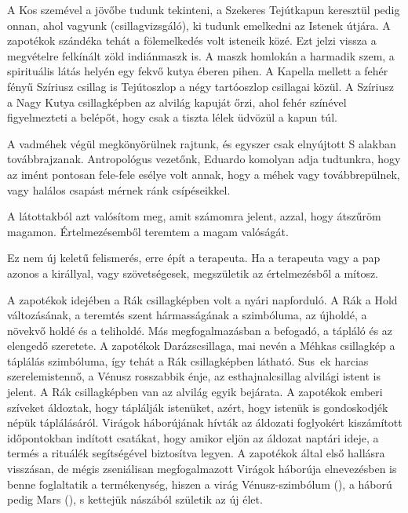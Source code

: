 A Kos szemével a jövőbe tudunk tekinteni, a Szekeres Tejútkapun
keresztül pedig onnan, ahol vagyunk (csillagvizsgáló), ki tudunk emelkedni
az Istenek útjára. A zapotékok szándéka tehát a fölemelkedés volt
isteneik közé. Ezt jelzi vissza a megvételre felkínált zöld indiánmaszk is.
A maszk homlokán a harmadik szem, a spirituális látás helyén egy fekvő
kutya éberen pihen. A Kapella mellett a fehér fényű Szíriusz csillag is
Tejútoszlop a négy tartóoszlop csillagai közül. A Szíriusz a Nagy Kutya
csillagképben az alvilág kapuját őrzi, ahol fehér színével figyelmezteti a
belépőt, hogy csak a tiszta lélek üdvözül a kapun túl.

A vadméhek végül megkönyörülnek rajtunk, és egyszer csak elnyújtott
S alakban továbbrajzanak. Antropológus vezetőnk, Eduardo
komolyan adja tudtunkra, hogy az imént pontosan fele-fele esélye volt
annak, hogy a méhek vagy továbbrepülnek, vagy halálos csapást mérnek
ránk csípéseikkel.


\bigskip
\begin{itshape}
A látottakból azt valósítom meg, amit számomra jelent, azzal, hogy
átszűröm magamon. Értelmezésemből teremtem a magam valóságát.
\end{itshape}
\bigskip

Ez nem új keletű felismerés, erre épít a terapeuta. Ha a terapeuta
vagy a pap azonos a királlyal, vagy szövetségesek, megszületik az
értelmezésből a mítosz.

A zapotékok idejében a Rák csillagképben volt a nyári napforduló.
A Rák a Hold változásának, a teremtés szent hármasságának a szimbóluma,
az újholdé, a növekvő holdé és a teliholdé. Más megfogalmazásban
a befogadó, a tápláló és az elengedő szeretete. A zapotékok
Darázscsillaga, mai nevén a Méhkas csillagkép a táplálás szimbóluma,
így tehát a Rák csillagképben látható. Sus~ek harcias szerelemistennő,
a Vénusz rosszabbik énje, az esthajnalcsillag alvilági istent is jelent.
A Rák csillagképben van az alvilág egyik bejárata. A zapotékok emberi
szíveket áldoztak, hogy táplálják istenüket, azért, hogy istenük is
gondoskodjék népük táplálásáról. Virágok háborújának hívták az áldozati
foglyokért kiszámított időpontokban indított csatákat, hogy amikor
eljön az áldozat naptári ideje, a termés a rituálék segítségével biztosítva
legyen. A zapotékok által első hallásra visszásan, de mégis zseniálisan
megfogalmazott Virágok háborúja elnevezésben is benne foglaltatik a
termékenység, hiszen a virág Vénusz-szimbólum (\female), a háború pedig
Mars (\male), s kettejük nászából születik az új élet.

